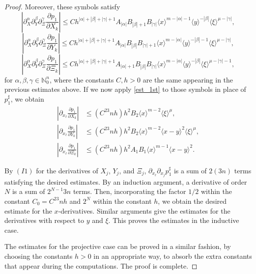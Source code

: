 \documentclass[10pt,a4paper]{amsart}
\begin{document}
\begin{proof}
	Moreover, these symbols satisfy
	\begin{equation*}
		\left|\partial^\alpha_X\partial^\beta_Y\partial^\gamma_\Xi
		\frac{\partial p_1}{\partial X_k}\right|
		\leq Ch^{|\alpha|+|\beta|+|\gamma|+1} A_{|\alpha|}B_{|\beta|+1}B_{|\gamma|} 
		\langle x\rangle^{m-|\alpha|-1}\langle y\rangle^{-|\beta|} \langle \xi\rangle^{\mu-|\gamma|},
	\end{equation*}
	\begin{equation*}
		\left|\partial^\alpha_X\partial^\beta_Y\partial^\gamma_\Xi
		\frac{\partial p_1}{\partial Y_k}\right|
		\leq Ch^{|\alpha|+|\beta|+|\gamma|+1}A_{|\alpha|} B_{|\beta|}B_{|\gamma|+1} 
		\langle x\rangle^{m-|\alpha|}\langle y\rangle^{-|\beta|-1}\langle \xi\rangle^{\mu-|\gamma|},
	\end{equation*}
	\begin{equation*}
		\left|
		\partial^\alpha_X\partial^\beta_Y\partial^\gamma_\Xi
		\frac{\partial p_1}{\partial \Xi_k}\right|\leq Ch^{|\alpha|+|\beta|+|\gamma|+1}A_{|\alpha|+1} B_{|\beta|}B_{|\gamma|} 
		\langle x\rangle^{m-|\alpha|}\langle y\rangle^{-|\beta|}\langle \xi\rangle^{\mu-|\gamma|-1},
	\end{equation*}
	for $\alpha,\beta,\gamma\in\mathbb{N}_0^n$, where the constants $C,h>0$ are the same appearing in the previous estimates above.
	If we now apply \eqref{est_1st} to those symbols in place of $p_1^\sharp$, we obtain
	\begin{align*}
		\left| \partial_{x_\ell}\frac{\partial p_1}{\partial X_k} \right| &\leq (C^23nh)h^2  B_2 \langle x\rangle^{m-2}\langle \xi\rangle^{\mu},
	\\		
		\left| \partial_{x_\ell}\frac{\partial p_1}{\partial Y_k} \right| &\leq (C^23nh)h^2 B_2\langle x\rangle^{m-2}\langle x-y\rangle^2 \langle \xi\rangle^{\mu},
	\\
		\left| \partial_{x_\ell}\frac{\partial p_1}{\partial \Xi_k} \right| &\leq (C^23nh)h^2 A_1 B_1 \langle x\rangle^{m-1}\langle x-y\rangle^2.
	\end{align*}
	
	By $(I1)$ for the derivatives of $X_j$, $Y_j$, and $\Xi_j$, $\partial_{x_\ell}\partial_{x_j}p_1^\sharp$ is a sum of $2(3n)$ terms satisfying the desired estimates. 
	By an induction argument, a derivative of order $N$ is a sum of $2^{N-1}3n$ terms. Then, incorporating the factor $1/2$ within the constant $C_0=C^23nh$ and 
	$2^N$ within the constant $h$, we obtain the desired estimate for the $x$-derivatives. Similar arguments give the estimates for the derivatives with respect to 
	$y$ and $\xi$. This proves the estimates in the inductive case.
	
	The estimates for the projective case can be proved in a similar fashion, by choosing the constants 
	$h>0$ in an appropriate way, to absorb the extra constants that appear during the computations. The proof is complete.
\end{proof}
\end{document}
